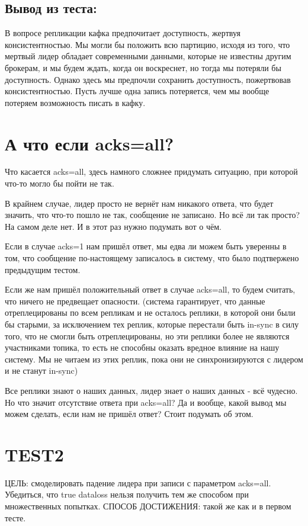 \documentclass[11pt]{article}
\begin{document}
    \subsection{Вывод из теста:}
    В вопросе репликации кафка предпочитает доступность, жертвуя консистентностью. Мы могли бы положить всю партицию, исходя из того, что мертвый лидер обладает современными данными, которые не известны другим брокерам, и мы будем ждать, когда он воскреснет, но тогда мы потеряли бы доступность. Однако здесь мы предпочли сохранить доступность, пожертвовав консистентностью. Пусть лучше одна запись потеряется, чем мы вообще потеряем возможность писать в кафку.
    
    \section{А что если acks=all?}
    Что касается acks=all, здесь намного сложнее придумать ситуацию, при которой что-то могло бы пойти не так.

    В крайнем случае, лидер просто не вернёт нам никакого ответа, что будет значить, что что-то пошло не так, сообщение не записано. Но всё ли так просто? На самом деле нет. И в этот раз нужно подумать вот о чём.

    Если в случае acks=1 нам пришёл ответ, мы едва ли можем быть уверенны в  том, что сообщение по-настоящему записалось в систему, что было подтвержено предыдущим тестом.

    Если же нам пришёл положительный ответ в случае acks=all, то будем считать, что ничего не предвещает опасности. (система гарантирует, что данные отреплецированы по всем репликам и не осталось реплики, в которой они были бы старыми, за исключением тех реплик, которые перестали быть in-sync в силу того, что не смогли быть отреплецированы, но эти реплики более не являются участниками топика, то есть не способны оказать вредное влияние на нашу систему. Мы не читаем из этих реплик, пока они не синхронизируются с лидером и не станут in-sync)

    Все реплики знают о наших данных, лидер знает о наших данных - всё чудесно. Но что значит отсутствие ответа при acks=all? Да и вообще, какой вывод мы можем сделать, если нам не пришёл ответ? Стоит подумать об этом.

    \section{TEST2}
    ЦЕЛЬ: смоделировать падение лидера при записи с параметром acks=all. Убедиться, что true dataloss нельзя получить тем же способом при множественных попытках.
    СПОСОБ ДОСТИЖЕНИЯ: такой же как и в первом тесте.
\end{document}
